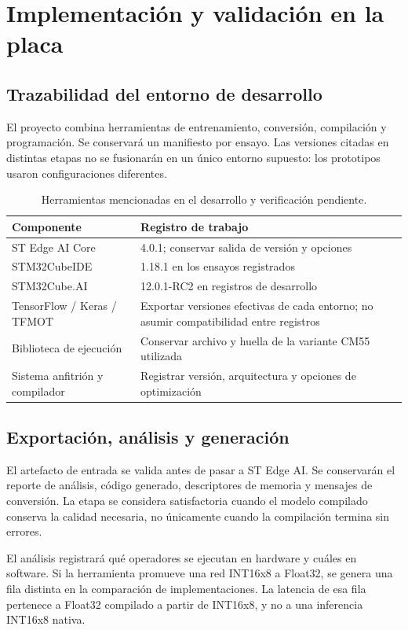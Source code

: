 \section{Implementación y validación en la placa}\label{cap:implementacion}
\subsection{Trazabilidad del entorno de desarrollo}
El proyecto combina herramientas de entrenamiento, conversión, compilación y programación. Se conservará un manifiesto por ensayo. Las versiones citadas en distintas etapas no se fusionarán en un único entorno supuesto: los prototipos usaron configuraciones diferentes.

\begin{table}[H]\centering\small
\caption{Herramientas mencionadas en el desarrollo y verificación pendiente.}
\begin{tabularx}{\linewidth}{p{4cm}Y}\toprule
Componente & Registro de trabajo\\\midrule
ST Edge AI Core & 4.0.1; conservar salida de versión y opciones\\
STM32CubeIDE & 1.18.1 en los ensayos registrados\\
STM32Cube.AI & 12.0.1-RC2 en registros de desarrollo\\
TensorFlow / Keras / TFMOT & Exportar versiones efectivas de cada entorno; no asumir compatibilidad entre registros\\
Biblioteca de ejecución & Conservar archivo y huella de la variante CM55 utilizada\\
Sistema anfitrión y compilador & Registrar versión, arquitectura y opciones de optimización\\\bottomrule
\end{tabularx}\end{table}

\subsection{Exportación, análisis y generación}
El artefacto de entrada se valida antes de pasar a ST Edge AI. Se conservarán el reporte de análisis, código generado, descriptores de memoria y mensajes de conversión. La etapa se considera satisfactoria cuando el modelo compilado conserva la calidad necesaria, no únicamente cuando la compilación termina sin errores.

El análisis registrará qué operadores se ejecutan en hardware y cuáles en software. Si la herramienta promueve una red INT16x8 a Float32, se genera una fila distinta en la comparación de implementaciones. La latencia de esa fila pertenece a Float32 compilado a partir de INT16x8, y no a una inferencia INT16x8 nativa.

